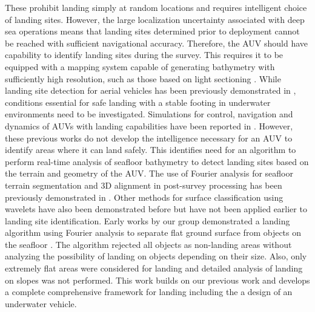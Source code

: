 These prohibit landing simply at random locations and requires intelligent choice of landing sites. However, the large localization uncertainty \cite{Masmitja2016} associated with deep sea operations means that landing sites determined prior to deployment cannot be reached with sufficient navigational accuracy. Therefore, the AUV should have capability to identify landing sites during the survey. This requires it to be equipped with a mapping system capable of generating bathymetry with sufficiently high resolution, such as those based on light sectioning \cite{Inglis2012} \cite{Nishida2016}. While landing site detection for aerial vehicles has been previously demonstrated in \cite{Desaraju2014} \cite{Sharp2001}, conditions essential for safe landing with a stable footing in underwater environments need to be investigated. Simulations for control, navigation and dynamics of AUVs with landing capabilities have been reported in \cite{Wang2007}\cite{Du2012}. However, these previous works do not develop the intelligence necessary for an AUV to identify areas where it can land safely. This identifies need for an algorithm to perform real-time analysis of seafloor bathymetry to detect landing sites based on the terrain and geometry of the AUV. The use of Fourier analysis for seafloor terrain segmentation and 3D alignment in post-survey processing has been previously demonstrated  in \cite{Douillard2012}\cite{Douillard2013}.  Other methods for surface classification using wavelets \cite{Bhandari2007} have also been demonstrated before but have not been applied earlier to landing site identification. Early works by our group demonstrated a landing algorithm using Fourier analysis to separate flat ground surface from objects on the seafloor \cite{Sangekar2010c}. The algorithm rejected all objects as non-landing areas without analyzing the possibility of landing on objects depending on their size. Also, only extremely flat areas were considered for landing and detailed analysis of landing on slopes was not performed. This work builds on our previous work and develops a complete comprehensive framework for landing including the a design of an underwater vehicle. 
